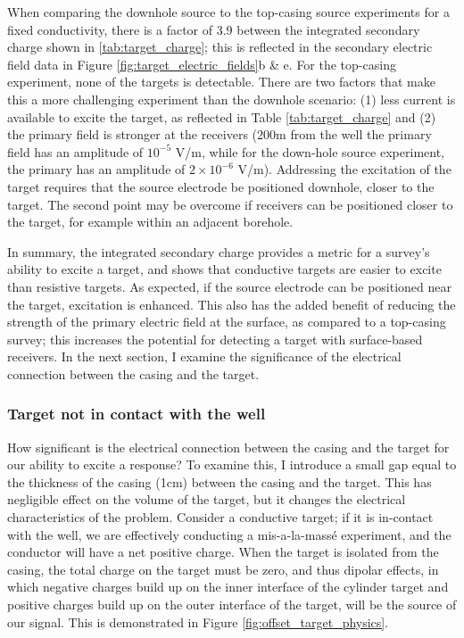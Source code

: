 When comparing the downhole source to the top-casing source experiments for a fixed conductivity, there is a factor of 3.9 between the integrated secondary charge shown in \ref{tab:target_charge}; this is reflected in the secondary electric field data in Figure \ref{fig:target_electric_fields}b \& e.  For the top-casing experiment, none of the targets is detectable. There are two factors that make this a more challenging experiment than the downhole scenario: (1) less current is available to excite the target, as reflected in Table \ref{tab:target_charge} and (2) the primary field is stronger at the receivers (200m from the well the primary field has an amplitude of $10^{-5}$ V/m, while for the down-hole source experiment, the primary has an amplitude of $2 \times 10^{-6}$ V/m). Addressing the excitation of the target requires that the source electrode be positioned downhole, closer to the target. The second point may be overcome if receivers can be positioned closer to the target, for example within an adjacent borehole.

In summary, the integrated secondary charge provides a metric for a survey's ability to excite a target, and shows that conductive targets are easier to excite than resistive targets. As expected, if the source electrode can be positioned near the target, excitation is enhanced. This also has the added benefit of reducing the strength of the primary electric field at the surface, as compared to a top-casing survey; this  increases the potential for detecting a target with surface-based receivers. In the next section, I examine the significance of the electrical connection between the casing and the target.

\subsubsection{Target not in contact with the well}

How significant is the electrical connection between the casing and the target for our ability to excite a response? To examine this, I introduce a small gap equal to the thickness of the casing (1cm) between the casing and the target. This has negligible effect on the volume of the target, but it changes the electrical characteristics of the problem. Consider a conductive target; if it is in-contact with the well, we are effectively conducting a mis-a-la-mass\'e experiment, and the conductor will have a net positive charge. When the target is isolated from the casing, the total charge on the target must be zero, and thus dipolar effects, in which negative charges build up on the inner interface of the cylinder target and positive charges build up on the outer interface of the target, will be the source of our signal. This is demonstrated in Figure \ref{fig:offset_target_physics}.

